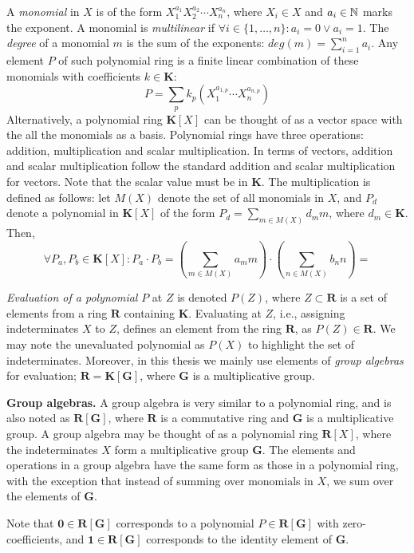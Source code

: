 A \emph{monomial} in $X$ is of the form 
$X_1^{a_1}X_2^{a_2}\cdots X_n^{a_n}$, where $X_i \in X$ and $a_i \in \mathbb N$ marks the exponent. 
A monomial is \emph{multilinear} if 
$\forall i \in \{1, \ldots, n\} \colon a_i = 0 \vee a_i = 1$. 
The \emph{degree} of a monomial $m$ 
is the sum of the exponents: $deg(m) = \sum_{i=1}^n a_i$. 
Any element $P$ of such polynomial ring is a finite linear combination of these monomials 
with coefficients $k \in \mathbf{K}$: 
\[
  P = \displaystyle \sum_p k_p(X_1^{a_{1,p}} \cdots X_n^{a_{n,p}})
\] 
Alternatively, a polynomial ring $\mathbf{K}[X]$ can be thought of as a vector space with 
the all the monomials as a basis. 
Polynomial rings have three operations: addition, multiplication 
and scalar multiplication. In terms of vectors, addition and scalar multiplication follow 
the standard addition and scalar multiplication for vectors. 
Note that the scalar value must be in $\mathbf{K}$. 
The multiplication is defined as follows: 
let $M(X)$ denote the set of all monomials in $X$, and 
$P_d$ denote a polynomial in $\mathbf{K}[X]$ of the form $P_d = \sum_{m \in M(X)} d_m m$, 
where $d_m \in \mathbf{K}$. Then, 
\[
  \forall P_a,P_b \in \mathbf{K}[X] \colon P_a \cdot P_b = (\displaystyle \sum_{m \in M(X)} a_m m)
  \cdot (\displaystyle \sum_{n \in M(X)} b_n n) = 
\]

\emph{Evaluation of a polynomial} $P$ at $Z$ is denoted $P(Z)$, where 
$Z \subset \mathbf{R}$ is a set of elements from a ring $\mathbf{R}$ containing $\mathbf{K}$. 
Evaluating at $Z$, i.e., assigning indeterminates $X$ to $Z$, defines an 
element from the ring $\mathbf{R}$, as $P(Z) \in \mathbf{R}$. We may note the unevaluated 
polynomial as $P(X)$ to highlight the set of indeterminates. 
Moreover, in this thesis we mainly use elements of \emph{group algebras} 
for evaluation; $\mathbf{R} = \mathbf{K}[\mathbf{G}]$, where $\mathbf{G}$ is a 
multiplicative group.

\textbf{Group algebras.} A group algebra is very similar to a polynomial ring, and 
is also noted as $\mathbf{R}[\mathbf{G}]$, where $\mathbf{R}$ is a commutative ring and 
$\mathbf{G}$ is a multiplicative group. A group algebra may be thought of as a 
polynomial ring $\mathbf{R}[X]$, where the indeterminates $X$ form a multiplicative group $\mathbf{G}$. 
The elements and operations in a group algebra have the same form as those in a polynomial ring, 
with the exception that instead of summing over monomials in $X$, 
we sum over the elements of $\mathbf{G}$.

Note that $\mathbf{0} \in \mathbf{R}[\mathbf{G}]$ corresponds to a 
polynomial $P \in \mathbf{R}[\mathbf{G}]$ with zero-coefficients, and 
$\mathbf{1} \in \mathbf{R}[\mathbf{G}]$ corresponds to the identity element of $\mathbf{G}$. 

